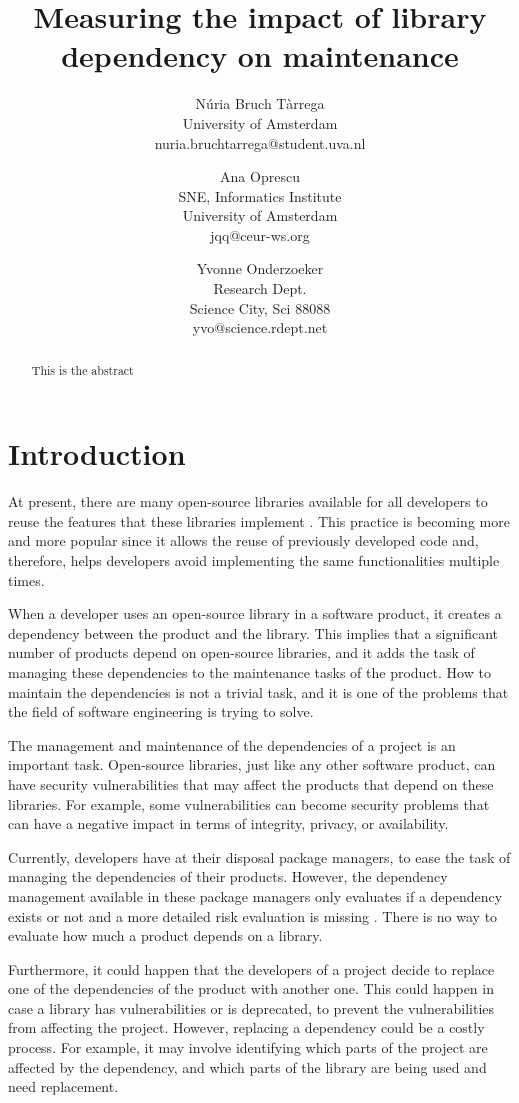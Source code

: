 \documentclass[a4paper]{article}
\title{Measuring the impact of library dependency on maintenance}
\author{
Núria Bruch Tàrrega \\ University of Amsterdam \\ nuria.bruchtarrega@student.uva.nl
\and
Ana Oprescu \\ SNE, Informatics Institute\\
                University of Amsterdam \\ jqq@ceur-ws.org
\and
Yvonne Onderzoeker \\ Research Dept.\\
                Science City, Sci 88088 \\ yvo@science.rdept.net
}
\begin{document}
\maketitle

\begin{abstract}
This is the abstract
\end{abstract}


\section{Introduction}
At present, there are many open-source libraries available for all developers to reuse the features that these libraries implement \cite{kikas2017structure}. This practice is becoming more and more popular since it allows the reuse of previously developed code and, therefore, helps developers avoid implementing the same functionalities multiple times.

When a developer uses an open-source library in a software product, it creates a dependency between the product and the library. This implies that a significant number of products depend on open-source libraries, and it adds the task of managing these dependencies to the maintenance tasks of the product. How to maintain the dependencies is not a trivial task, and it is one of the problems that the field of software engineering is trying to solve.

The management and maintenance of the dependencies of a project is an important task. Open-source libraries, just like any other software product, can have security vulnerabilities that may affect the products that depend on these libraries. For example, some vulnerabilities can become security problems that can have a negative impact in terms of integrity, privacy, or availability.

Currently, developers have at their disposal package managers, to ease the task of managing the dependencies of their products. However, the dependency management available in these package managers only evaluates if a dependency exists or not and a more detailed risk evaluation is missing \cite{hejderup2018prazi}. There is no way to evaluate how much a product depends on a library.

Furthermore, it could happen that the developers of a project decide to replace one of the dependencies of the product with another one. This could happen in case a library has vulnerabilities or is deprecated, to prevent the vulnerabilities from affecting the project. However, replacing a dependency could be a costly process. For example, it may involve identifying which parts of the project are affected by the dependency, and which parts of the library are being used and need replacement.
\end{document}
